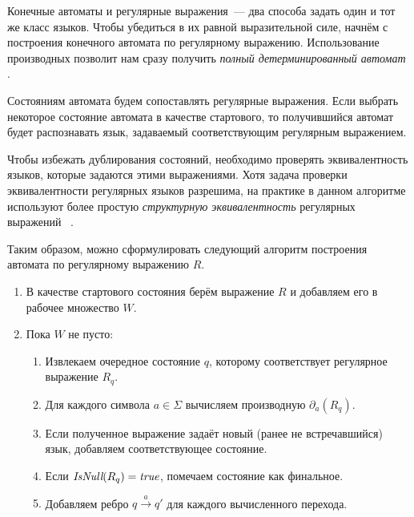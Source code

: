 Конечные автоматы и регулярные выражения~--- два способа задать один и тот же класс языков.
Чтобы убедиться в их равной выразительной силе, начнём с построения конечного автомата по регулярному выражению.
Использование производных позволит нам сразу получить \emph{полный детерминированный автомат}%
.

Состояниям автомата будем сопоставлять регулярные выражения.
Если выбрать некоторое состояние автомата в качестве стартового, то получившийся автомат будет распознавать язык, задаваемый соответствующим регулярным выражением.

Чтобы избежать дублирования состояний, необходимо проверять эквивалентность языков, которые задаются этими выражениями.
Хотя задача проверки эквивалентности регулярных языков разрешима, на практике в данном алгоритме используют более простую \emph{структурную эквивалентность} регулярных выражений%
~.


Таким образом, можно сформулировать следующий алгоритм построения автомата по регулярному выражению $R$.

\begin{enumerate}
    \item В качестве стартового состояния берём выражение $R$ и добавляем его в рабочее множество $W$.
    \item Пока $W$ не пусто:
    \begin{enumerate}
        \item Извлекаем очередное состояние $q$, которому соответствует регулярное выражение $R_q$.
        \item Для каждого символа $a \in \Sigma$ вычисляем производную $\partial_a(R_q)$.
        \item Если полученное выражение задаёт новый (ранее не встречавшийся) язык, добавляем соответствующее состояние.
        \item Если $\emph{IsNull}(R_q) = \emph{true}$, помечаем состояние как финальное.
        \item Добавляем ребро $q \xrightarrow{a} q'$ для каждого вычисленного перехода.
    \end{enumerate}
\end{enumerate}

